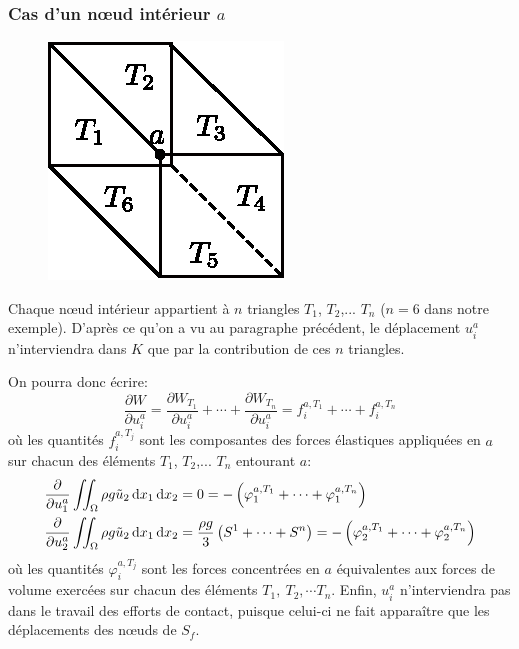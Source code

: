 \subsubsection{Cas d'un nœud intérieur $a$}
\begin{figure}
    \begin{center}
        \includegraphics{../images/T1_Ch09-12}
    \end{center}
\end{figure}
Chaque nœud intérieur appartient à $n$ triangles $T_1$, $T_2$,... $T_n$ ($n=6$ dans notre exemple).
D'après ce qu'on a vu au paragraphe précédent, le déplacement $u_i^ a$ n'interviendra dans $K$ que par la contribution de ces $n$ triangles.

On pourra donc écrire: 
\begin{equation}
    \frac{\partial W}{\partial u_i^a} = \frac{\partial W_{T_1}}{\partial u_i^a} + \cdots + \frac{\partial W_{T_n}}{\partial u_i^a} = f_i^{a,T_1} + \cdots + f_i^{a, T_n}
    \label{eq:Ch09-087}
\end{equation}
où les quantités $f_i^{a,T_j}$ sont les composantes des forces élastiques appliquées en $a$ sur chacun des éléments  $T_1$, $T_2$,... $T_n$ entourant $a$:
\begin{equation}
    \begin{aligned}
        \frac{\partial }{\partial u_1^a} \iint_{\Omega} \rho g \tilde{u}_2 \mathop{\mathrm{{}d}}\mathopen{} x_1 \mathop{\mathrm{{}d}}\mathopen{} x_2 &= 0 = - \left( \varphi_1^{a,T_1} + \cdots + \varphi_1^{a,T_n} \right) \\
        \frac{\partial }{\partial u_2^a} \iint_{\Omega} \rho g \tilde{u}_2 \mathop{\mathrm{{}d}}\mathopen{} x_1 \mathop{\mathrm{{}d}}\mathopen{} x_2 &= \frac{\rho g}{3} \left( S^1 + \cdots + S^n \right) = - \left( \varphi_2^{a,T_1} + \cdots + \varphi_2^{a,T_n} \right)
    \end{aligned}
    \label{eq:Ch09-088}
\end{equation}
où les quantités $\varphi_i^{a,T_j}$ sont les forces concentrées en $a$ équivalentes aux forces de volume exercées sur chacun des éléments $T_1,\ T_2, \cdots T_n$.
Enfin, $u_i^a$ n'interviendra pas dans le travail des efforts de contact, puisque celui-ci ne fait apparaître que les déplacements des nœuds de $S_f$.

